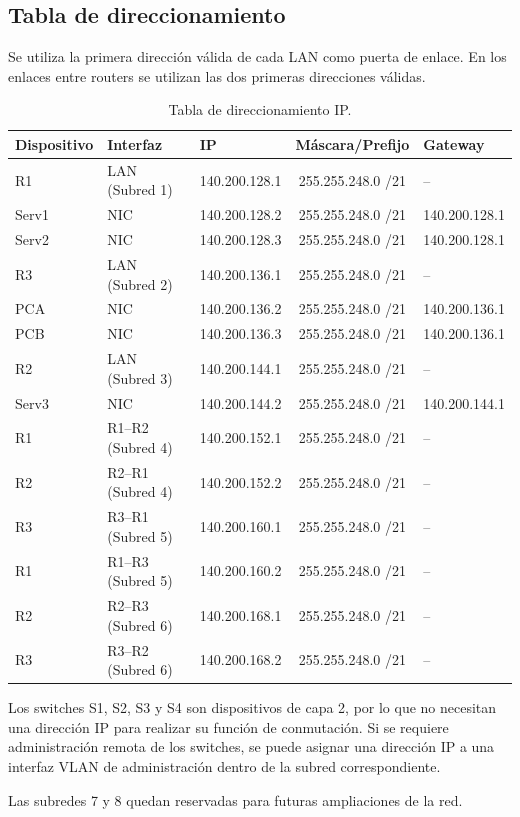 \documentclass[12pt]{article}
\begin{document}
\subsection{Tabla de direccionamiento}

Se utiliza la primera dirección válida de cada LAN como puerta de enlace.
En los enlaces entre routers se utilizan las dos primeras direcciones válidas.

\begin{table}[h]
\centering
\small
\begin{tabular}{l|l|l|c|l}
\textbf{Dispositivo} & \textbf{Interfaz} & \textbf{IP} &
\textbf{Máscara/Prefijo} & \textbf{Gateway}\\
\hline
R1 & LAN (Subred 1) & 140.200.128.1 & 255.255.248.0 /21 & --\\
Serv1 & NIC & 140.200.128.2 & 255.255.248.0 /21 & 140.200.128.1\\
Serv2 & NIC & 140.200.128.3 & 255.255.248.0 /21 & 140.200.128.1\\
\hline
R3 & LAN (Subred 2) & 140.200.136.1 & 255.255.248.0 /21 & --\\
PCA & NIC & 140.200.136.2 & 255.255.248.0 /21 & 140.200.136.1\\
PCB & NIC & 140.200.136.3 & 255.255.248.0 /21 & 140.200.136.1\\
\hline
R2 & LAN (Subred 3) & 140.200.144.1 & 255.255.248.0 /21 & --\\
Serv3 & NIC & 140.200.144.2 & 255.255.248.0 /21 & 140.200.144.1\\
\hline
R1 & R1--R2 (Subred 4) & 140.200.152.1 & 255.255.248.0 /21 & --\\
R2 & R2--R1 (Subred 4) & 140.200.152.2 & 255.255.248.0 /21 & --\\
\hline
R3 & R3--R1 (Subred 5) & 140.200.160.1 & 255.255.248.0 /21 & --\\
R1 & R1--R3 (Subred 5) & 140.200.160.2 & 255.255.248.0 /21 & --\\
\hline
R2 & R2--R3 (Subred 6) & 140.200.168.1 & 255.255.248.0 /21 & --\\
R3 & R3--R2 (Subred 6) & 140.200.168.2 & 255.255.248.0 /21 & --
\end{tabular}
\caption{Tabla de direccionamiento IP.}
\end{table}

Los switches S1, S2, S3 y S4 son dispositivos de capa 2, por lo que no
necesitan una dirección IP para realizar su función de conmutación. Si se
requiere administración remota de los switches, se puede asignar una
dirección IP a una interfaz VLAN de administración dentro de la subred
correspondiente.

Las subredes 7 y 8 quedan reservadas para futuras ampliaciones de la red.
\end{document}
